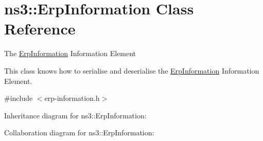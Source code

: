 \hypertarget{classns3_1_1ErpInformation}{}\section{ns3\+:\+:Erp\+Information Class Reference}
\label{classns3_1_1ErpInformation}


The \hyperlink{classns3_1_1ErpInformation}{Erp\+Information} Information Element

This class knows how to serialise and deserialise the \hyperlink{classns3_1_1ErpInformation}{Erp\+Information} Information Element.  




{\ttfamily \#include $<$erp-\/information.\+h$>$}



Inheritance diagram for ns3\+:\+:Erp\+Information\+:


Collaboration diagram for ns3\+:\+:Erp\+Information\+:

